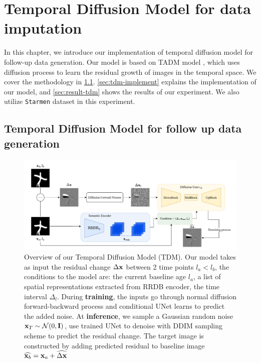 \chapter{Temporal Diffusion Model for data imputation}
\label{chap:tdm}

In this chapter, we introduce our implementation of temporal diffusion model for follow-up data generation. Our model is based on TADM model \cite{litricoTADMTemporallyAwareDiffusion2024}, which uses diffusion process to learn the residual growth of images in the temporal space. We cover the methodology in \cref{sec:TDM}. \cref{sec:tdm-implement} explains the implementation of our model, and \cref{sec:result-tdm} shows the results of our experiment. We also utilize \texttt{Starmen} dataset in this experiment.  

\minitoc

\section{Temporal Diffusion Model for follow up data generation}
\label{sec:TDM}

\begin{figure}
    \centering
    \includegraphics[width=1\linewidth]{figures/model-tdm.pdf}
    \caption[Overview of TDM framework]{Overview of our Temporal Diffusion Model (TDM). Our model takes as input the residual change $\Delta{\mathbf{x}}$ between 2 time points $l_a < l_b$, the conditions to the model are: the current baseline age $l_a$, a list of spatial representations extracted from RRDB \cite{zhang2018RRDB} encoder, the time interval $\Delta_l$. During \textbf{training}, the inputs go through normal diffusion forward-backward process and conditional UNet learns to predict the added noise. At \textbf{inference}, we sample a Gaussian random noise ${\mathbf{x}}_T \sim \mathcal{N}(0, \mathbf{I})$, use trained UNet to denoise with DDIM sampling scheme to predict the residual change. The target image is constructed by adding predicted residual to baseline image $\widehat{{\mathbf{x}}_b} = {\mathbf{x}}_a + \widehat{\Delta{\mathbf{x}}}$}
    \label{fig:model-tdm}
\end{figure}

